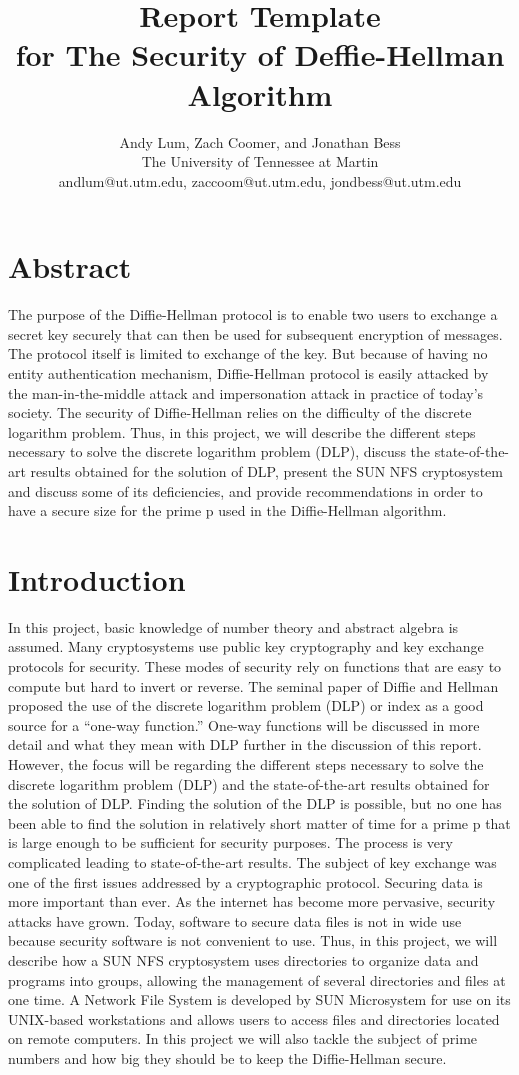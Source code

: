 \documentclass{article}
\title{Report Template 
\\ for The Security of Deffie-Hellman Algorithm}
\author{Andy Lum, Zach Coomer, and Jonathan Bess\\
The University of Tennessee at Martin\\
andlum@ut.utm.edu, zaccoom@ut.utm.edu, jondbess@ut.utm.edu}
\date{ }
\begin{document}
\maketitle
\doublespacing
\section{Abstract}
The purpose of the Diffie-Hellman protocol is to enable two users to exchange a secret key securely that
can then be used for subsequent encryption of messages. The protocol itself is limited to exchange of the key. But because of having no entity authentication mechanism, Diffie-Hellman protocol is easily attacked by the man-in-the-middle attack and impersonation attack in practice of today's society. The security of Diffie-Hellman relies on the difficulty of the discrete logarithm problem. Thus, in this project, we will describe the different steps necessary to solve the discrete logarithm problem (DLP), discuss the state-of-the-art results obtained for the solution of DLP, present the SUN NFS cryptosystem and discuss some of its deficiencies, and provide recommendations in order to have a secure size for the prime p used in the Diffie-Hellman algorithm.

\section{Introduction}
In this project, basic knowledge of number theory and abstract algebra is assumed. Many cryptosystems use public key cryptography and key exchange protocols for security. These modes of security rely on functions that are easy to compute but hard to invert or reverse. The seminal paper of Diffie and Hellman proposed the use of the discrete logarithm problem (DLP) or index as a good source for a “one-way function.” One-way functions will be discussed in more detail and what they mean with DLP further in the discussion of this report. However, the focus will be regarding the different steps necessary to solve the discrete logarithm problem (DLP) and the state-of-the-art results obtained for the solution of DLP. Finding the solution of the DLP is possible, but no one has been able to find the solution in relatively short matter of time for a prime p that is large enough to be sufficient for security purposes. The process is very complicated leading to state-of-the-art results. The subject of key exchange was one of the first issues addressed by a cryptographic protocol. Securing data is more important than ever. As the internet has become more pervasive, security attacks have grown. Today, software to secure data files is not in wide use because security software is not convenient to use. Thus, in this project, we will describe how a SUN NFS cryptosystem uses directories to organize data and programs into groups, allowing the management of several directories and files at one time. A Network File System is developed by SUN Microsystem for use on its UNIX-based workstations and allows users to access files and directories located on remote computers. In this project we will also tackle the subject of prime numbers and how big they should be to keep the Diffie-Hellman secure.
\end{document}
